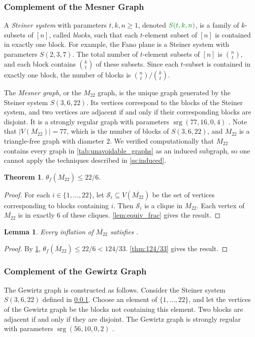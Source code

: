 \documentclass[11pt]{article}
\numberwithin{equation}{section}
\theoremstyle{plain}
\newtheorem{thm}[equation]{Theorem}
\newtheorem{lem}[equation]{Lemma}
\theoremstyle{definition}
\renewcommand{\geq}{\geqslant}
\renewcommand{\leq}{\leqslant}
\DeclareMathOperator{\srg}{srg}
\newcommand{\defn}[1]{\textcolor{green!50!black}{\textit{#1}}}
\newcommand{\mathdefn}[1]{\textcolor{green!50!black}{#1}}
\begin{document}
\subsubsection{Complement of the Mesner Graph}
\label{sss:mesner}
A \defn{Steiner system} with parameters $t, k, n \geq 1$, denoted $\mathdefn{S(t,k,n)}$, is a family of $k$-subsets of $[n]$, called \defn{blocks}, such that each $t$-element subset of $[n]$ is contained in exactly one block.
For example, the Fano plane is a Steiner system with parameters $S(2,3,7)$.
The total number of $t$-element subsets of $[n]$ is $\binom{n}{t}$, and each block contains $\binom{k}{t}$ of these subsets.
Since each $t$-subset is contained in exactly one block, the number of blocks is $\binom{n}{t}/\binom{k}{t}$.

The \defn{Mesner graph}, or the \defn{$M_{22}$} graph, is the unique graph generated by the Steiner system $S(3,6,22)$.
Its vertices correspond to the blocks of the Steiner system, and two vertices are adjacent if and only if their corresponding blocks are disjoint.
It is a strongly regular graph with parameters $\srg(77, 16, 0, 4)$ \citep{Mesner}.
Note that $\left|V(M_{22})\right| = 77$, which is the number of blocks of $S(3,6,22)$, and $M_{22}$ is a triangle-free graph with diameter $2$.
We verified computationally that $M_{22}$ contains every graph in \cref{tab:unavoidable_graphs} as an induced subgraph, so one cannot apply the techniques described in \cref{ss:induced}.

\begin{thm}
    \label{fractional_m22} $\theta_f(\overline{{M}_{22}}) \leq 22/6$.
\end{thm}
\begin{proof}
    For each $i \in \{1, \dots, 22\}$, let $\mathcal{S}_i \subseteq V(\overline{{M}_{22}})$ be the set of vertices corresponding to blocks containing $i$. Then $\mathcal{S}_i$ is a clique in $\overline{M_{22}}$. Each vertex of $\overline{M_{22}}$ is in exactly $6$ of these cliques. \cref{lem:equiv_frac} gives the result.
\end{proof}
\begin{lem}
    \label{lem:inflation_m22}
    Every inflation of $\overline{M_{22}}$ satisfies .
\end{lem}
\begin{proof}
    By \cref{fractional_m22}, $\theta_f(\overline{M}_{22}) \leq 22/6 < 124/33$. \cref{thm:124/33} gives the result.
\end{proof}

\subsubsection{Complement of the Gewirtz Graph}
\label{sss:gewirtz}
The Gewirtz graph is constructed as follows. Consider the Steiner system $S(3,6,22)$ defined in \cref{sss:mesner}. Choose an element of $\{1, \dots, 22\}$, and let the vertices of the Gewirtz graph be the blocks not containing this element. Two blocks are adjacent if and only if they are disjoint. The Gewirtz graph is strongly regular with parameters $\srg(56, 10, 0, 2)$ \citep{Gewirtz}.
\end{document}

